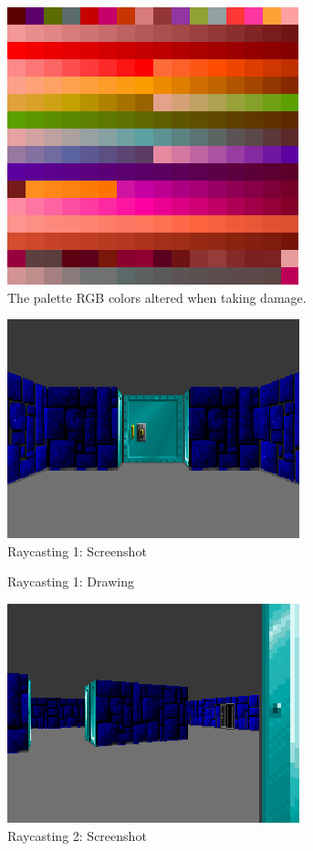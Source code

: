 \documentclass[book.tex]{subfiles}
\begin{document}
\begin{figure}[H]
  \centering
 \includegraphics[scale=1.3]{imgs/palette_damage.png}
 \caption{The palette RGB colors altered when taking damage.} \label{fig:palette_damage}
\end{figure}



\begin{figure}[H]
  \centering
 \includegraphics[scale=1.3]{imgs/ray_caster_explained/beginning.png}
 \caption{Raycasting 1: Screenshot} \label{fig:Raycasting2Drawing}
\end{figure}

\begin{figure}[H]
  \centering
  
 \caption{Raycasting 1: Drawing} \label{fig:Raycasting1}
\end{figure}




\begin{figure}[H]
  \centering
 \includegraphics[scale=1.3]{imgs/ray_caster_explained/out_door.png}
 \caption{Raycasting 2: Screenshot} \label{fig:Raycasting2Drawing}
\end{figure}
\end{document}
